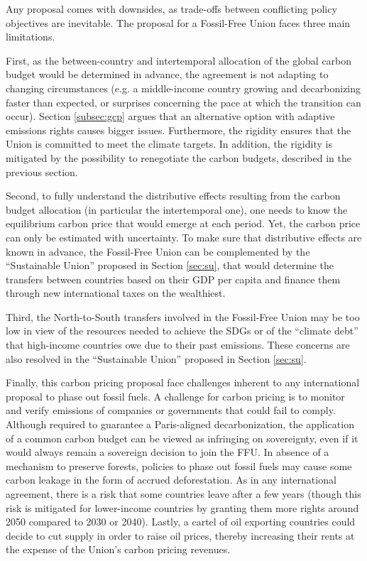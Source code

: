 \documentclass[12pt,english]{article}
\begin{document}
Any proposal comes with downsides, as trade-offs between conflicting policy objectives are inevitable. The proposal for a Fossil-Free Union faces three main limitations. 

First, as the between-country and intertemporal allocation of the global carbon budget would be determined in advance, the agreement is not adapting to changing circumstances (e.g. a middle-income country growing and decarbonizing faster than expected, or surprises concerning the pace at which the transition can occur). Section \ref{subsec:gcp} argues that an alternative option with adaptive emissions rights causes bigger issues. Furthermore, the rigidity ensures that the Union is committed to meet the climate targets. In addition, the rigidity is mitigated by the possibility to renegotiate the carbon budgets, described in the previous section. 

Second, to fully understand the distributive effects resulting from the carbon budget allocation (in particular the intertemporal one), one needs to know the equilibrium carbon price that would emerge at each period. Yet, the carbon price can only be estimated with uncertainty. To make sure that distributive effects are known in advance, the Fossil-Free Union can be complemented by the ``Sustainable Union'' proposed in Section \ref{sec:su}, that would determine the transfers between countries based on their GDP per capita and finance them through new international taxes on the wealthiest.

Third, the North-to-South transfers involved in the Fossil-Free Union may be too low in view of the resources needed to achieve the SDGs or of the ``climate debt'' that high-income countries owe due to their past emissions. These concerns are also resolved in the ``Sustainable Union'' proposed in Section \ref{sec:su}.

Finally, this carbon pricing proposal face challenges inherent to any international proposal to phase out fossil fuels. A challenge for carbon pricing is to monitor and verify emissions of companies or governments that could fail to comply. Although required to guarantee a Paris-aligned decarbonization, the application of a common carbon budget can be viewed as infringing on sovereignty, even if it would always remain a sovereign decision to join the FFU. In absence of a mechanism to preserve forests, policies to phase out fossil fuels may cause some carbon leakage in the form of accrued deforestation. As in any international agreement, there is a risk that some countries leave after a few years (though this risk is mitigated for lower-income countries by granting them more rights around 2050 compared to 2030 or 2040). Lastly, a cartel of oil exporting countries could decide to cut supply in order to raise oil prices, thereby increasing their rents at the expense of the Union's carbon pricing revenues. %
\end{document}
